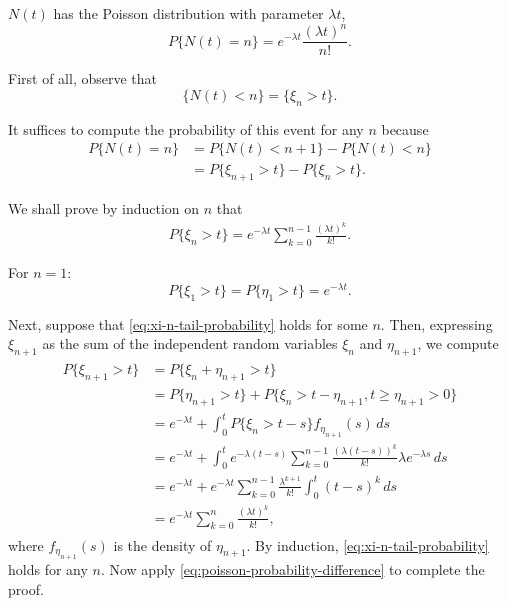\begin{Proposition}
\label{prop:poisson-process-distribution}
$N(t)$ has the Poisson distribution with parameter $\lambda t$,
\begin{equation}
P\{N(t) = n\} = e^{-\lambda t} \frac{(\lambda t)^n}{n!}.
\label{eq:poisson-process-pmf}
\end{equation}

\begin{Proof}
First of all, observe that
\begin{equation}
\{N(t) < n\} = \{\xi_n > t\}.
\label{eq:poisson-event-equivalence}
\end{equation}

It suffices to compute the probability of this event for any $n$ because
\begin{equation}
\begin{aligned}
P\{N(t) = n\} &= P\{N(t) < n + 1\} - P\{N(t) < n\} \\
&= P\{\xi_{n+1} > t\} - P\{\xi_n > t\}.
\end{aligned}
\tag{6.3}
\label{eq:poisson-probability-difference}
\end{equation}

We shall prove by induction on $n$ that
\begin{align}
P\{\xi_n > t\} = e^{-\lambda t} \sum_{k=0}^{n-1} \frac{(\lambda t)^k}{k!}. \tag{6.4}
\label{eq:xi-n-tail-probability}
\end{align}

For $n = 1$:
\[
P\{\xi_1 > t\} = P\{\eta_1 > t\} = e^{-\lambda t}.
\]

Next, suppose that \cref{eq:xi-n-tail-probability} holds for some $n$. Then, expressing $\xi_{n+1}$ as the sum of the independent random variables $\xi_n$ and $\eta_{n+1}$, we compute
\begin{align}
\begin{aligned}
P\{\xi_{n+1} > t\} &= P\{\xi_n + \eta_{n+1} > t\} \\
&= P\{\eta_{n+1} > t\} + P\{\xi_n > t - \eta_{n+1}, t \geq \eta_{n+1} > 0\} \\
&= e^{-\lambda t} + \int_0^t P\{\xi_n > t - s\} f_{\eta_{n+1}}(s) \, ds \\
&= e^{-\lambda t} + \int_0^t e^{-\lambda(t-s)} \sum_{k=0}^{n-1} \frac{(\lambda(t-s))^k}{k!} \lambda e^{-\lambda s} \, ds \\
&= e^{-\lambda t} + e^{-\lambda t} \sum_{k=0}^{n-1} \frac{\lambda^{k+1}}{k!} \int_0^t (t-s)^k \, ds \\
&= e^{-\lambda t} \sum_{k=0}^n \frac{(\lambda t)^k}{k!},
\end{aligned}
\end{align}
where $f_{\eta_{n+1}}(s)$ is the density of $\eta_{n+1}$. By induction, \cref{eq:xi-n-tail-probability} holds for any $n$. Now apply \cref{eq:poisson-probability-difference} to complete the proof.
\end{Proof}
\end{Proposition}

